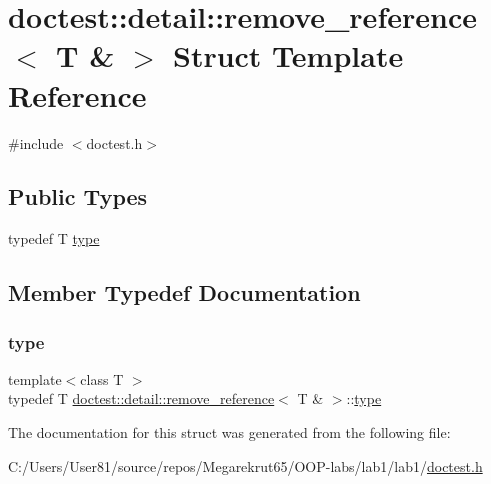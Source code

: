 \hypertarget{structdoctest_1_1detail_1_1remove__reference_3_01_t_01_6_01_4}{}\section{doctest\+:\+:detail\+:\+:remove\+\_\+reference$<$ T \& $>$ Struct Template Reference}
\label{structdoctest_1_1detail_1_1remove__reference_3_01_t_01_6_01_4}


{\ttfamily \#include $<$doctest.\+h$>$}

\subsection*{Public Types}
\begin{DoxyCompactItemize}
\item 
typedef T \mbox{\hyperlink{structdoctest_1_1detail_1_1remove__reference_3_01_t_01_6_01_4_a37201537c0190f14f504d9f507bc042a}{type}}
\end{DoxyCompactItemize}


\subsection{Member Typedef Documentation}
\mbox{\label{structdoctest_1_1detail_1_1remove__reference_3_01_t_01_6_01_4_a37201537c0190f14f504d9f507bc042a}} 
\subsubsection{\texorpdfstring{type}{type}}
{\footnotesize\ttfamily template$<$class T $>$ \\
typedef T \mbox{\hyperlink{structdoctest_1_1detail_1_1remove__reference}{doctest\+::detail\+::remove\+\_\+reference}}$<$ T \& $>$\+::\mbox{\hyperlink{structdoctest_1_1detail_1_1remove__reference_3_01_t_01_6_01_4_a37201537c0190f14f504d9f507bc042a}{type}}}



The documentation for this struct was generated from the following file\+:\begin{DoxyCompactItemize}
\item 
C\+:/\+Users/\+User81/source/repos/\+Megarekrut65/\+O\+O\+P-\/labs/lab1/lab1/\mbox{\hyperlink{doctest_8h}{doctest.\+h}}\end{DoxyCompactItemize}
